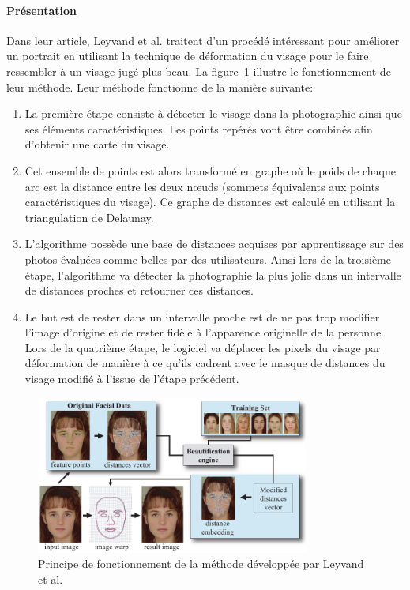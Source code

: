 \documentclass[11pt, french]{report-rd-info}
\begin{document}
\paragraph{Présentation}
Dans leur article, Leyvand et al. \cite{Leyvand2008} traitent d'un procédé intéressant pour améliorer un portrait en utilisant la technique de déformation du visage pour le faire ressembler à un visage jugé plus beau. La figure~\ref{fig:FonctionnemenLeyvand} illustre le fonctionnement de leur méthode. Leur méthode fonctionne de la manière suivante:
\begin{enumerate}
\item La première étape consiste à détecter le visage dans la photographie ainsi que ses éléments caractéristiques. Les points repérés vont être combinés afin d’obtenir une carte du visage.
\item Cet ensemble de points est alors transformé en graphe où le poids de chaque arc est la distance entre les deux nœuds (sommets équivalents aux points caractéristiques du visage). Ce graphe de distances est calculé en utilisant la triangulation de Delaunay.
\item L'algorithme possède une base de distances acquises par apprentissage sur des photos évaluées comme belles par des utilisateurs. Ainsi lors de la troisième étape, l'algorithme va détecter la photographie la plus jolie dans un intervalle de distances proches et retourner ces distances.
\item Le but est de rester dans un intervalle proche est de ne pas trop modifier l'image d'origine et de rester fidèle à l'apparence originelle de la personne.
Lors de la quatrième étape, le logiciel va déplacer les pixels du visage par déformation de manière à ce qu'ils cadrent avec le masque de distances du visage modifié à l’issue de l'étape précédent.
\end{enumerate}
\begin{figure}
	\centering
\includegraphics[width=0.8\textwidth]{Images/ea_algo_datadriven}
	\caption{Principe de fonctionnement de la méthode développée par Leyvand et al. \cite{Leyvand2008}}
	\label{fig:FonctionnemenLeyvand}
\end{figure}
\end{document}
